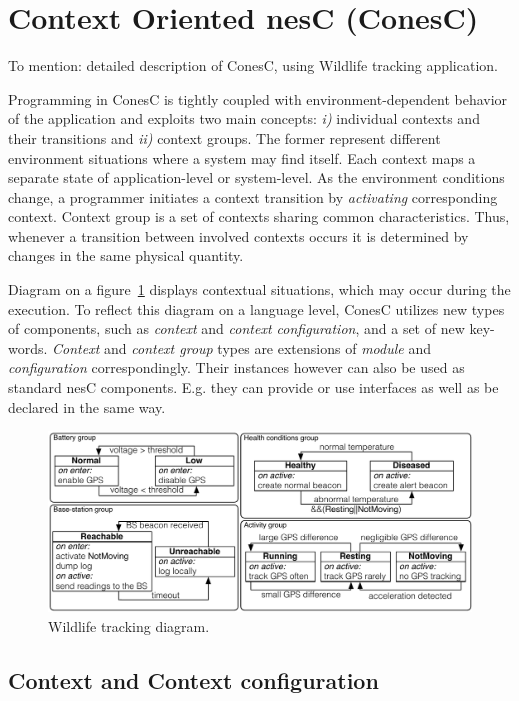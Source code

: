 \section{Context Oriented nesC (ConesC)} To mention: detailed description of
ConesC, using Wildlife tracking application.

Programming in ConesC is tightly coupled with environment-dependent behavior of
the application and exploits two main concepts: \emph{i)} individual contexts
and their transitions and \emph{ii)} context groups. The former represent
different environment situations where a system may find itself. Each context
maps a separate state of application-level or system-level. As the environment
conditions change, a programmer initiates a context transition by
\emph{activating} corresponding context. Context group is a set of contexts
sharing common characteristics. Thus, whenever a transition between involved
contexts occurs it is determined by changes in the same physical quantity.

Diagram on a figure~\ref{fig:wtd} displays contextual situations, which may
occur during the execution. To reflect this diagram on a language level, ConesC
utilizes new types of components, such as \emph{context} and \emph{context
configuration}, and a set of new key-words. \emph{Context} and \emph{context
group} types are extensions of \emph{module} and \emph{configuration}
correspondingly. Their instances however can also be used as standard nesC
components. E.g. they can provide or use interfaces as well as be declared in
the same way.

\begin{figure}[!h]
\centering
\includegraphics[width=\columnwidth]{pdf/wildlifetracking}
\caption{Wildlife tracking diagram.}
\label{fig:wtd}
\end{figure}

\subsection{Context and Context configuration}


